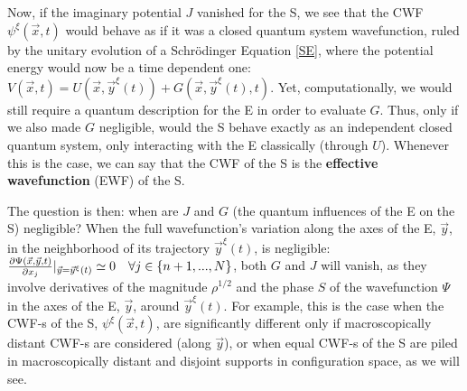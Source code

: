 \documentclass[11pt, a4paper]{article} %
\begin{document}


Now, if the imaginary potential $J$ vanished for the S, we see that the CWF $\psi^\xi(\vec{x},t)$ would behave as if it was a closed quantum system wavefunction, ruled by the unitary evolution of a Schrödinger Equation \eqref{SE}, where the potential energy would now be a time dependent one: $V(\vec{x},t)=U(\vec{x},\vec{y}^\xi(t))+G(\vec{x},\vec{y}^\xi(t),t)$. Yet, computationally, we would still require a quantum description for the E in order to evaluate $G$. Thus, only if we also made $G$ negligible, would the S behave exactly as an independent closed quantum system, only interacting with the E classically (through $U$). Whenever this is the case, we can say that the CWF of the S is the {\bf effective wavefunction} (EWF) of the S. 

The question is then: when are $J$ and $G$ (the quantum influences of the E on the S) negligible? When the full wavefunction's variation along the axes of the E, $\vec{y}$, in the neighborhood of its trajectory $\vec{y}^\xi(t)$, is negligible: $\pdv{\Psi(\vec{x},\vec{y},t)}{x_j}\rvert_{\vec{y}=\vec{y}^\xi(t)}\simeq 0  \quad \forall j\in\{n+1,...,N\}$, both $G$ and $J$ will vanish, as they involve derivatives of the magnitude $\rho^{1/2}$ and the phase $S$ of the wavefunction $\Psi$ in the axes of the E, $\vec{y}$, around $\vec{y}^\xi(t)$. For example, this is the case when the CWF-s of the S, $\psi^\xi(\vec{x},t)$, are significantly different only if macroscopically distant CWF-s are considered (along $\vec{y}$), or when equal CWF-s of the S are piled in macroscopically distant and disjoint supports in configuration space, as we will see.
\end{document}
